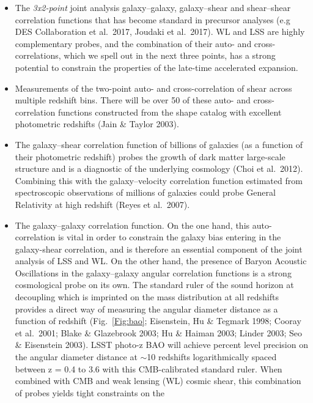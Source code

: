 \begin{itemize}
\item The {\sl 3x2-point} joint analysis galaxy--galaxy, galaxy--shear and shear--shear
correlation functions that has become standard in precursor analyses (e.g DES Collaboration
et al.~2017, Joudaki et al.~2017). WL and LSS are highly complementary probes, and the combination
of their auto- and cross-correlations, which we spell out in the next three points, has a strong
potential to constrain the properties of the late-time accelerated expansion.
\item Measurements of the two-point auto- and cross-correlation of shear across multiple redshift bins.
There will be over 50 of these auto- and cross-correlation functions constructed from the shape catalog with excellent photometric redshifts
(Jain \& Taylor 2003).
%
\item The galaxy--shear correlation function of billions of galaxies (as a function of their
photometric redshift) probes the growth of dark matter large-scale structure and is a
diagnostic of the underlying cosmology (Choi et al.~2012). Combining this with the
galaxy--velocity correlation function estimated from spectroscopic observations of millions of galaxies
could probe General Relativity at high redshift (Reyes et al.~2007).
%
\item The galaxy--galaxy correlation function. On the one hand, this auto-correlation is vital in
order to constrain the galaxy bias entering in the galaxy-shear correlation, and is therefore
an essential component of the joint analysis of LSS and WL. On the other hand, the presence of
Baryon Acoustic Oscillations in the galaxy--galaxy angular correlation functions is a strong cosmological
probe on its own. The standard ruler of the sound horizon at decoupling which is imprinted on the
mass distribution at all redshifts provides a direct way of measuring the angular diameter
distance as a function of redshift (Fig.~\ref{Fig:bao}; Eisenstein, Hu \& Tegmark 1998;
Cooray et al.~2001; Blake \& Glazebrook 2003; Hu \& Haiman 2003; Linder 2003; Seo \&
Eisenstein 2003). LSST photo-z BAO will achieve percent level precision on the angular
diameter distance at $\sim$10 redshifts logarithmically spaced between z = 0.4 to 3.6
with this CMB-calibrated standard ruler. When combined with CMB
and weak lensing (WL) cosmic shear, this combination of probes yields tight constraints on the

\end{itemize}
